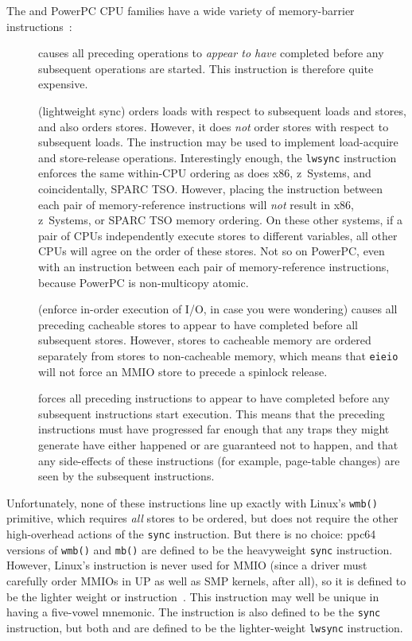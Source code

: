 The \Power{} and PowerPC CPU families have a wide variety of memory-barrier
instructions~\cite{PowerPC94,MichaelLyons05a}:
\begin{description}
\item	[] causes all preceding operations to {\em appear to have}
	completed before any subsequent operations are started.
	This instruction is therefore quite expensive.
\item	[] (lightweight sync) orders loads with respect to
	subsequent loads and stores, and also orders stores.
	However, it does {\em not} order stores with respect to subsequent
	loads.
	The  instruction may be used to implement
	load-acquire and store-release operations.
	Interestingly enough, the {\tt lwsync} instruction enforces
	the same within-CPU ordering as does x86, z~Systems, and coincidentally,
	SPARC TSO.
	However, placing the  instruction between each
	pair of memory-reference instructions will \emph{not}
	result in x86, z~Systems, or SPARC TSO memory ordering.
	On these other systems, if a pair of CPUs independently execute
	stores to different variables, all other CPUs will agree on the
	order of these stores.
	Not so on PowerPC, even with an  instruction between each
	pair of memory-reference instructions, because PowerPC is
	non-multicopy atomic.
\item	[] (enforce in-order execution of I/O, in case you
	were wondering) causes all preceding cacheable stores to appear
	to have completed before all subsequent stores.
	However, stores to cacheable memory are ordered separately from
	stores to non-cacheable memory, which means that {\tt eieio}
	will not force an MMIO store to precede a spinlock release.
\item	[] forces all preceding instructions to appear to have
	completed before any subsequent instructions start execution.
	This means that the preceding instructions must have progressed
	far enough that any traps they might generate have either happened
	or are guaranteed not to happen, and that any side-effects of
	these instructions (for example, page-table changes) are seen by the
	subsequent instructions.
\end{description}

Unfortunately, none of these instructions line up exactly with Linux's
{\tt wmb()} primitive, which requires {\em all} stores to be ordered,
but does not require the other high-overhead actions of the {\tt sync}
instruction.
But there is no choice: ppc64 versions of {\tt wmb()} and {\tt mb()} are
defined to be the heavyweight {\tt sync} instruction.
However, Linux's  instruction is never used for MMIO
(since a driver must carefully order MMIOs in UP as well as
SMP kernels, after all), so it is defined to be the lighter weight
 or  instruction~\cite{PaulEMcKenney2016LinuxKernelMMIO}.
This instruction may well be unique in having a five-vowel mnemonic.
The  instruction is also defined to be the {\tt sync}
instruction, but both  and  are defined to
be the lighter-weight {\tt lwsync} instruction.

